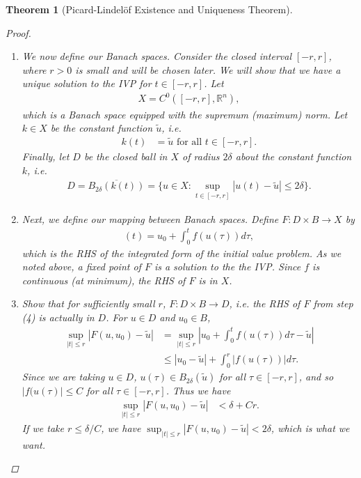 \documentclass[12pt]{amsart}         %
\newtheorem{theorem}{Theorem}[section]
\theoremstyle{remark}
\newcommand{\R}{\mathbb{R}}
\begin{document}
\begin{theorem}[Picard-Lindel\"{o}f Existence and Uniqueness Theorem]
\begin{proof}
\begin{enumerate}
\item We now define our Banach spaces. Consider the closed interval $[-r, r]$, where $r > 0$ is small and will be chosen later. We will show that we have a unique solution to the IVP for $t \in [-r, r]$. Let
\begin{align*}
X = C^0([-r, r], \R^n),
\end{align*}
which is a Banach space equipped with the supremum (maximum) norm. Let $k \in X$ be the constant function $\tilde{u}$, i.e.
\begin{align*}
k(t) &= \tilde{u} \text{ for all } t \in [-r, r].
\end{align*}
Finally, let $D$ be the closed ball in $X$ of radius $2 \delta$ about the constant function $k$, i.e.
\begin{align*}
D = \overline{ B_{2\delta}(k(t)) } = \{ u \in X : \sup_{t \in [-r,r]} | u(t) - \tilde{u} | \leq 2 \delta \}.
\end{align*}
\item Next, we define our mapping between Banach spaces. Define $F: D \times B \rightarrow X$ by
\begin{align*}
[F(u, u_0)](t) = u_0 + \int_0^t f(u(\tau)) d \tau,
\end{align*}
which is the RHS of the integrated form of the initial value problem. As we noted above, a fixed point of $F$ is a solution to the the IVP. Since $f$ is continuous (at minimum), the RHS of $F$ is in $X$.

\item Show that for sufficiently small $r$, $F: D \times B \rightarrow D$, i.e. the RHS of $F$ from step (4) is actually in $D$. For $u \in D$ and $u_0 \in B$,
\begin{align*}
\sup_{|t| \leq r} |F(u, u_0) - \tilde{u}| &= 
\sup_{|t| \leq r} \left|u_0 + \int_0^t f(u(\tau)) d\tau - \tilde{u}\right| \\
&\leq |u_0 - \tilde{u}| + \int_0^r |f(u(\tau))| d \tau.
\end{align*}
Since we are taking $u \in D$, $u(\tau) \in B_{2 \delta}(\tilde{u})$ for all $\tau \in [-r, r]$, and so $|f(u(\tau)| \leq C$ for all $\tau \in [-r, r]$. Thus we have
\begin{align*}
\sup_{|t| \leq r} |F(u, u_0) - \tilde{u}|
&< \delta + C r.
\end{align*}
If we take $r \leq \delta/C$, we have $\sup_{|t| \leq r} |F(u, u_0) - \tilde{u}| < 2 \delta$, which is what we want.


\end{enumerate}
\end{proof}
\end{theorem}
\end{document}
